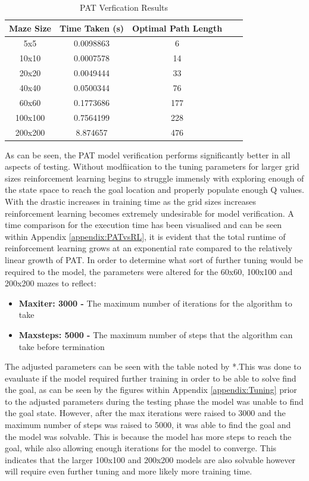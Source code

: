 \documentclass[twoside, 12pt, a4paper]{article}
\begin{document}
\begin{table}[ht]
\begin {center}
\begin{tabular}{ | c | c | c | c | c |}
\hline
 \textbf{Maze Size} & \textbf{ Time Taken (s)} &  \textbf{Optimal Path Length}  \\
\hline
5x5 		& 0.0098863	& 6	 \\
10x10 	& 0.0007578	& 14	 \\
20x20 	& 0.0049444 & 33	 \\
40x40		& 0.0500344	& 76	 \\
60x60 	& 0.1773686	& 177	 \\
100x100	& 0.7564199	& 228	 \\
200x200	& 8.874657	& 476	 \\
\hline
\end {tabular}
\caption{\label{tab:table-name}PAT Verfication Results}
\end {center}
\end{table}
\newpage
As can be seen, the PAT model verification performs significantly better in all aspects of testing. Without modfiication to the tuning parameters for larger grid sizes reinforcement learning begins to struggle immensly with exploring enough of the state space to reach the goal location and properly populate enough Q values. With the drastic increases in training time as the grid sizes increases reinforcement learning becomes extremely undesirable for model verification. A time comparison for the execution time has been visualised and can be seen within Appendix \ref{appendix:PATvsRL}, it is evident that the total runtime of reinforcement learning grows at an exponential rate compared to the relatively linear growth of PAT. In order to determine what sort of further tuning would be required to the model, the parameters were altered for the 60x60, 100x100 and 200x200 mazes to reflect:
\begin{itemize}
\item \textbf{Maxiter: 3000 -} The maximum number of iterations for the algorithm to take
\item \textbf{Maxsteps: 5000 -} The maximum number of steps that the algorithm can take before termination
\end{itemize}
The adjusted parameters can be seen with the table noted by *.This was done to evauluate if the model required further training in order to be able to solve find the goal, as can be seen by the figures within Appendix \ref{appendix:Tuning} prior to the adjusted parameters during the testing phase the model was unable to find the goal state. However, after the max iterations were raised to 3000 and the maximum number of steps was raised to 5000,  it was able to find the goal and the model was solvable. This is because the model has more steps to reach the goal, while also allowing enough iterations for the model to converge. This indicates that the larger 100x100  and 200x200 models are also solvable however will require even further tuning and more likely more training time. \\
\end{document}
